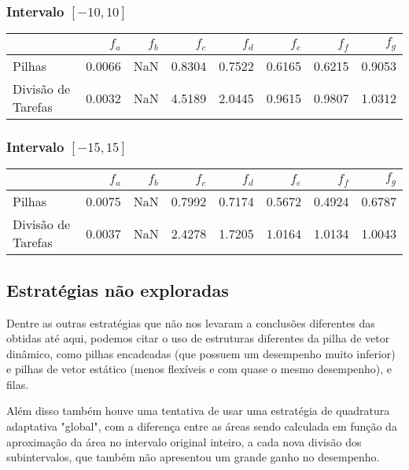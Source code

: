 \documentclass[11pt]{article}
\begin{document}
\subsubsection{Intervalo \([-10, 10]\)}
\label{sec:org479eb49}
\begin{center}
\begin{tabular}{lrrrrrrr}
 & \(f_a\) & \(f_b\) & \(f_c\) & \(f_d\) & \(f_e\) & \(f_f\) & \(f_g\)\\
\hline
Pilhas & 0.0066 & NaN & 0.8304 & 0.7522 & 0.6165 & 0.6215 & 0.9053\\
Divisão de Tarefas & 0.0032 & NaN & 4.5189 & 2.0445 & 0.9615 & 0.9807 & 1.0312\\
\end{tabular}
\end{center}

\subsubsection{Intervalo \([-15, 15]\)}
\label{sec:org7a3dcb6}
\begin{center}
\begin{tabular}{lrrrrrrr}
 & \(f_a\) & \(f_b\) & \(f_c\) & \(f_d\) & \(f_e\) & \(f_f\) & \(f_g\)\\
\hline
Pilhas & 0.0075 & NaN & 0.7992 & 0.7174 & 0.5672 & 0.4924 & 0.6787\\
Divisão de Tarefas & 0.0037 & NaN & 2.4278 & 1.7205 & 1.0164 & 1.0134 & 1.0043\\
\end{tabular}
\end{center}

\subsection{Estratégias não exploradas}
\label{sec:org26468d5}
Dentre as outras estratégias que não nos levaram a conclusões diferentes das obtidas até aqui,
podemos citar o uso de estruturas diferentes da pilha de vetor dinâmico, como pilhas encadeadas
(que possuem um desempenho muito inferior) e pilhas de vetor estático (menos flexíveis e com quase
o mesmo desempenho), e filas.

Além disso também houve uma tentativa de usar uma estratégia de quadratura adaptativa "global", com
a diferença entre as áreas sendo calculada em função da aproximação da área no intervalo original inteiro,
a cada nova divisão dos subintervalos, que também não apresentou um grande ganho no desempenho.
\end{document}
